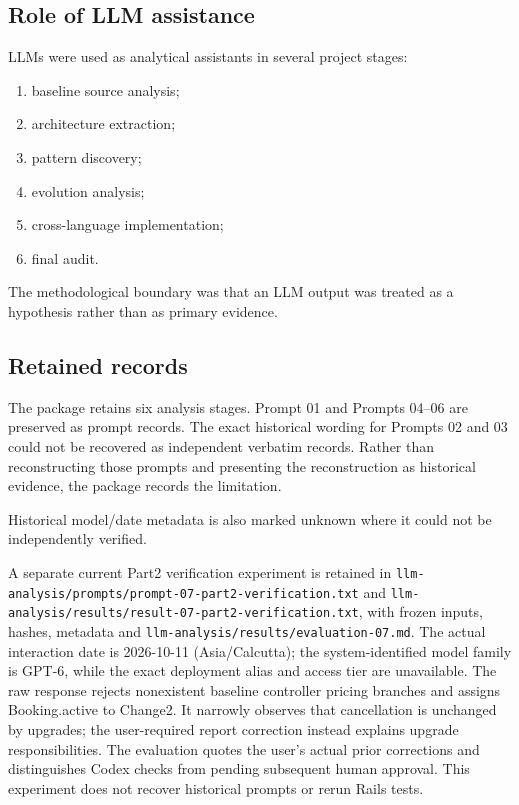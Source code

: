 \documentclass[10pt,a4paper]{article}
\newcommand{\code}[1]{\texttt{\small #1}}
\begin{document}
\subsection{Role of LLM assistance}

LLMs were used as analytical assistants in several project stages:

\begin{enumerate}[leftmargin=*]
\item baseline source analysis;
\item architecture extraction;
\item pattern discovery;
\item evolution analysis;
\item cross-language implementation;
\item final audit.
\end{enumerate}

The methodological boundary was that an LLM output was treated as a hypothesis rather than as primary evidence.



\subsection{Retained records}

The package retains six analysis stages. Prompt 01 and Prompts 04--06 are preserved as prompt records. The exact historical wording for Prompts 02 and 03 could not be recovered as independent verbatim records. Rather than reconstructing those prompts and presenting the reconstruction as historical evidence, the package records the limitation.

Historical model/date metadata is also marked unknown where it could not be independently verified.

A separate current Part2 verification experiment is retained in \code{llm-analysis/prompts/prompt-07-part2-verification.txt} and \code{llm-analysis/results/result-07-part2-verification.txt}, with frozen inputs, hashes, metadata and \code{llm-analysis/results/evaluation-07.md}. The actual interaction date is 2026-10-11 (Asia/Calcutta); the system-identified model family is GPT-6, while the exact deployment alias and access tier are unavailable. The raw response rejects nonexistent baseline controller pricing branches and assigns Booking.active to Change2. It narrowly observes that cancellation is unchanged by upgrades; the user-required report correction instead explains upgrade responsibilities. The evaluation quotes the user's actual prior corrections and distinguishes Codex checks from pending subsequent human approval. This experiment does not recover historical prompts or rerun Rails tests.
\end{document}
